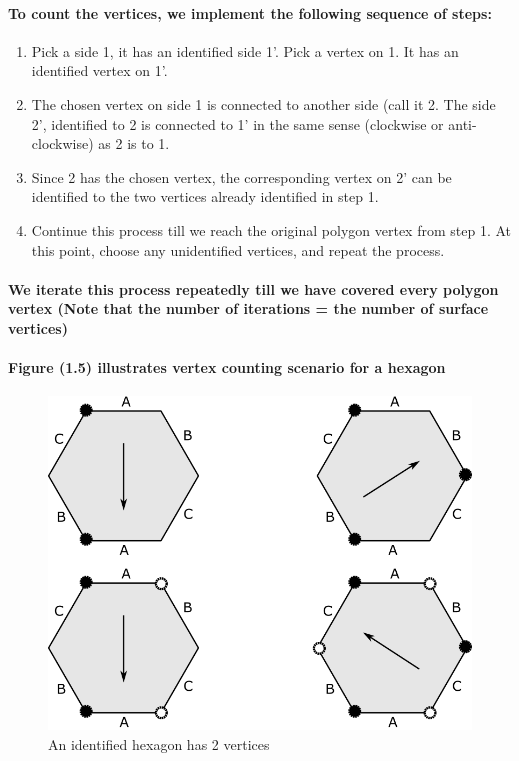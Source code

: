 \documentclass{report}
\begin{document}
\paragraph{To count the vertices, we implement the following sequence of steps:}


\begin{enumerate}

\item Pick a side 1, it has an identified side 1’. Pick a vertex on 1. It has an identified vertex on 1’.

\item The chosen vertex on side 1 is connected to another side (call it 2. The side 2’, identified to 2 is connected to 1’ in the same sense (clockwise or anti-clockwise) as 2 is to 1.

\item Since 2 has the chosen vertex, the corresponding vertex on 2’ can be identified to the two vertices already identified in step 1.

\item Continue this process till we reach the original polygon vertex from step 1. At this point, choose any unidentified vertices, and repeat the process.

\end{enumerate}


\paragraph{We iterate this process repeatedly till we have covered every polygon vertex (Note that the number of iterations = the number of surface vertices)}

\paragraph{Figure (1.5) illustrates vertex counting scenario for a hexagon}

\begin{figure} 
\begin{center}
\includegraphics[scale=0.3]{5}
\caption{An identified hexagon has 2 vertices}
\end{center}
\end{figure}
\end{document}
